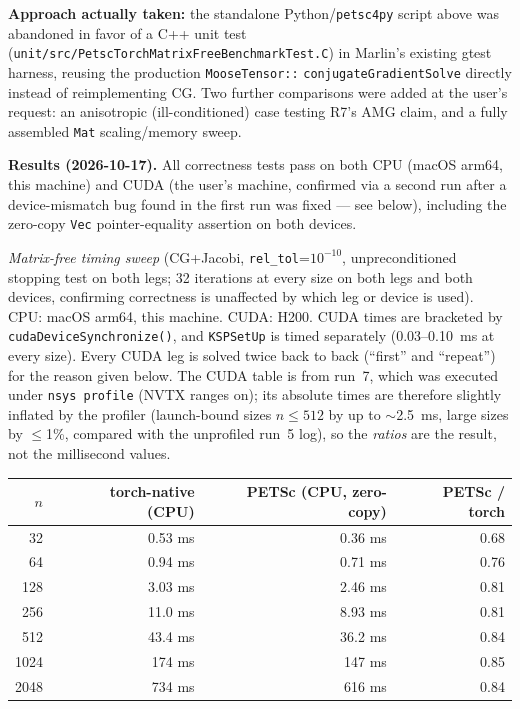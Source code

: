 \documentclass[11pt]{article}
\begin{document}
\textbf{Approach actually taken:} the standalone Python/\texttt{petsc4py}
script above was abandoned in favor of a C++ unit test
(\texttt{unit/src/PetscTorchMatrixFreeBenchmarkTest.C}) in Marlin's existing
gtest harness, reusing the production \texttt{MooseTensor::}
\texttt{conjugateGradientSolve} directly instead of reimplementing CG. Two
further comparisons were added at the user's request: an anisotropic
(ill-conditioned) case testing R7's AMG claim, and a fully assembled
\texttt{Mat} scaling/memory sweep.

\textbf{Results (2026-10-17).} All correctness tests pass on both CPU
(macOS arm64, this machine) and CUDA (the user's machine, confirmed via a
second run after a device-mismatch bug found in the first run was fixed
--- see below), including the zero-copy \texttt{Vec} pointer-equality
assertion on both devices.

\textit{Matrix-free timing sweep} (CG+Jacobi, \texttt{rel\_tol}=$10^{-10}$,
unpreconditioned stopping test on both legs; 32 iterations at every size
on both legs and both devices, confirming correctness is unaffected by
which leg or device is used). CPU: macOS arm64, this machine. CUDA: H200.
CUDA times are bracketed by \texttt{cudaDeviceSynchronize()}, and
\texttt{KSPSetUp} is timed separately (0.03--0.10~ms at every size). Every
CUDA leg is solved twice back to back (``first'' and ``repeat'') for the
reason given below. The CUDA table is from run~7, which was executed under
\texttt{nsys profile} (NVTX ranges on); its absolute times are therefore
slightly inflated by the profiler (launch-bound sizes $n\le512$ by up to
$\sim$2.5~ms, large sizes by $\le$1\%, compared with the unprofiled run~5
log), so the \textit{ratios} are the result, not the millisecond values.

\begin{center}
\footnotesize
\begin{tabular}{rrrr}
\toprule
$n$ & torch-native (CPU) & PETSc (CPU, zero-copy) & PETSc / torch \\
\midrule
32 & 0.53 ms & 0.36 ms & 0.68 \\
64 & 0.94 ms & 0.71 ms & 0.76 \\
128 & 3.03 ms & 2.46 ms & 0.81 \\
256 & 11.0 ms & 8.93 ms & 0.81 \\
512 & 43.4 ms & 36.2 ms & 0.84 \\
1024 & 174 ms & 147 ms & 0.85 \\
2048 & 734 ms & 616 ms & 0.84 \\
\bottomrule
\end{tabular}
\end{center}
\end{document}
